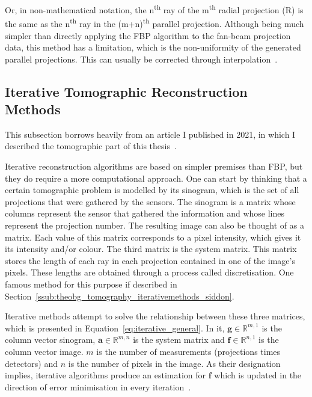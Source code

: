 Or, in non-mathematical notation, the n\textsuperscript{th} ray of the
m\textsuperscript{th} radial projection (R) is the same as the
n\textsuperscript{th} ray in the (m+n)\textsuperscript{th} parallel
projection. Although being much simpler than directly applying the
\gls{FBP} algorithm to the fan-beam projection data, this method has a
limitation, which is the non-uniformity of the generated parallel
projections. This can usually be corrected through
interpolation~\cite{Kak2001a}. 

\subsection{Iterative Tomographic Reconstruction Methods}%
\label{sub:theobg_tomography_iterativemethods}

This subsection borrows heavily from an article I published in 2021, in
which I described the tomographic part of this
thesis~\cite{ValentedeAlmeida2020}.  

Iterative reconstruction algorithms are based on simpler premises than
\gls{FBP}, but they do require a more computational approach. One can
start by thinking that a certain tomographic problem is modelled by its
sinogram, which is the set of all projections that were gathered by the
sensors. The sinogram is a matrix whose columns represent the sensor
that gathered the information and whose lines represent the projection
number. The resulting image can also be thought of as a matrix. Each
value of this matrix corresponds to a pixel intensity, which gives it
its intensity and/or colour. The third matrix is the system matrix. This
matrix stores the length of each ray in each projection contained in one
of the image's pixels. These lengths are obtained through a process
called discretisation. One famous method for this purpose if described
in Section~\ref{ssub:theobg_tomography_iterativemethods_siddon}.

Iterative methods attempt to solve the relationship between these three
matrices, which is presented in Equation~\ref{eq:iterative_general}. In
it, $\mathbf{g}\in\mathbb{R}^{m, 1}$ is the column vector sinogram,
$\mathbf{a} \in \mathbb{R}^{m,n}$ is the system matrix and $\mathbf{f}
\in \mathbb{R}^{n, 1}$ is the column vector image. $m$ is the number of
measurements (projections times detectors) and $n$ is the number of
pixels in the image. As their designation implies, iterative algorithms
produce an estimation for $\mathbf{f}$ which is updated in the direction
of error minimisation in every iteration~\cite{Kak2001, Bruyant2002}.

